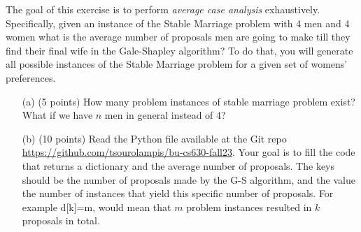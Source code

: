 \documentclass[11pt]{article}
\theoremstyle{theorem}
\theoremstyle{lemma}
\theoremstyle{corollary}
\theoremstyle{definition}
\begin{document}
The goal of this exercise is to perform {\it average case analysis} exhaustively.  Specifically, given an instance of the Stable Marriage problem with 4 men and 4 women  what is the average number of proposals men are going to make till they find their final wife in the Gale-Shapley algorithm?  To do that, you will generate all possible instances of the Stable Marriage problem for a given set of womens' preferences. 

\begin{itemize}
    \item [(a)] (5 points)   How many problem instances of stable marriage problem exist? What if we have $n$ men in general instead of 4?   

    \item [(b)] (10 points) Read the Python file available at the Git repo \url{https://github.com/tsourolampis/bu-cs630-fall23}. Your goal is to fill the code that returns a dictionary and the average number of proposals. The keys should be the number of proposals made by the G-S algorithm, and the value the number of instances that yield this specific number of proposals. For example d[k]=m, would mean that $m$ problem instances resulted in $k$ proposals in total.
\end{itemize}
 
\end{document}
